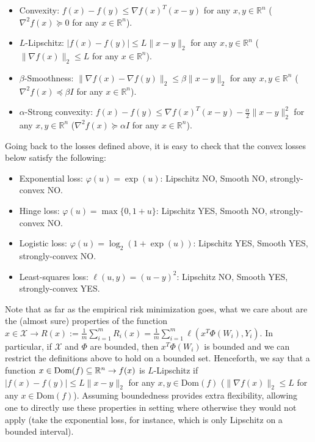 \begin{itemize}
	\item Convexity: $f(x) - f(y) \le \nabla f(x)^T(x - y)$ for any $x,y\in\mathbb{R}^n$ ($\nabla^2 f(x) \succcurlyeq 0$ for any $x\in\mathbb{R}^n$).
	\item $L$-Lipschitz: $| f(x) - f(y) | \le L \| x - y \|_2$ for any $x,y\in\mathbb{R}^n$ ($\|\nabla f(x)\|_2 \le L$ for any $x\in\mathbb{R}^n$).
	\item $\beta$-Smoothness: $\| \nabla f(x) - \nabla f(y) \|_2 \le \beta \| x - y \|_2$ for any $x,y\in\mathbb{R}^n$ ($\nabla^2 f(x) \preccurlyeq \beta I$ for any $x\in\mathbb{R}^n$).
	\item $\alpha$-Strong convexity: $f(x) - f(y) \le \nabla f(x)^T(x - y) - \frac{\alpha}{2}\|x - y\|_2^2$ for any $x,y\in\mathbb{R}^n$ ($\nabla^2 f(x) \succcurlyeq \alpha I$ for any $x\in\mathbb{R}^n$).
\end{itemize}

Going back to the losses defined above, it is easy to check that the convex losses below satisfy the following:
\begin{itemize}
\item Exponential loss: $\varphi(u) = \exp(u)$: Lipschitz NO, Smooth NO, strongly-convex NO.
\item Hinge loss: $\varphi(u) = \max\{0,1+u\}$: Lipschitz YES, Smooth NO, strongly-convex NO.
\item Logistic loss: $\varphi(u) = \log_2(1+\exp(u))$: Lipschitz YES, Smooth YES, strongly-convex NO.
\item Least-squares loss: $\ell(u,y) = (u-y)^2$: Lipschitz NO, Smooth YES, strongly-convex YES.
\end{itemize}

Note that as far as the empirical risk minimization goes, what we care about are the (almost sure) properties of the function $x\in\mathcal{X}\rightarrow R(x) := \frac{1}{m} \sum_{i=1}^m R_i(x) = \frac{1}{m} \sum_{i=1}^m \ell(x^T\Phi(W_i),Y_i)$. In particular, if $\mathcal{X}$ and $\Phi$ are bounded, then $x^T\Phi(W_i)$ is bounded and we can restrict the definitions above to hold on a bounded set. Henceforth, we say that a function $x\in \text{Dom}(f)\subseteq\mathbb{R}^n\rightarrow f(x)$ is $L$-Lipschitz if $| f(x) - f(y) | \le L \| x - y \|_2$ for any $x,y\in \text{Dom}(f)$ ($\|\nabla f(x)\|_2 \le L$ for any $x\in\text{Dom}(f)$). Assuming boundedness provides extra flexibility, allowing one to directly use these properties in setting where otherwise they would not apply (take the exponential loss, for instance, which is only Lipschitz on a bounded interval).

